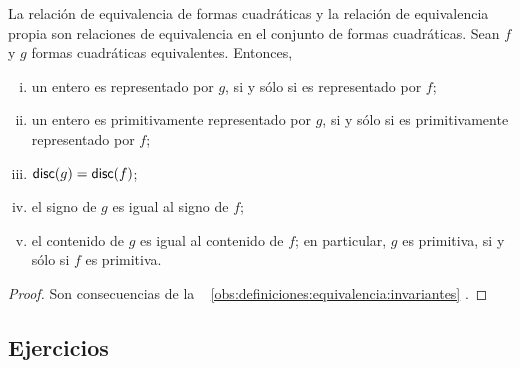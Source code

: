 \begin{teoDefiniciones}\label{teo:definiciones:equivalencia:invariantes}
	La relaci\'on de equivalencia de formas cuadr\'aticas y la
	relaci\'on de equivalencia propia son relaciones de equivalencia
	en el conjunto de formas cuadr\'aticas.
	Sean $f$ y $g$ formas cuadr\'aticas equivalentes. Entonces,
	\begin{enumerate}[(i)]
		\item\label{item:definiciones:invariantes:representados}
			un entero es representado por $g$, si y s\'olo si
			es representado por $f$;
		\item\label{item:definiciones:invariantes:propiamente}
			un entero es primitivamente representado por $g$,
			si y s\'olo si es primitivamente representado por $f$;
		\item\label{item:definiciones:invariantes:discriminante}
			$\mathsf{disc}(g)=\mathsf{disc}(f)$;
		\item\label{item:definiciones:invariantes:signo}
			el signo de $g$ es igual al signo de $f$;
		\item\label{item:definiciones:invariantes:contenido}
			el contenido de $g$ es igual al contenido de $f$;
			en particular,
			$g$ es primitiva, si y s\'olo si
			$f$ es primitiva.
	\end{enumerate}
\end{teoDefiniciones}

\begin{proof}
	Son consecuencias de la \obsname~%
	\ref{obs:definiciones:equivalencia:invariantes}
	\quedacomoejercicio.
\end{proof}

\subsection*{Ejercicios}


